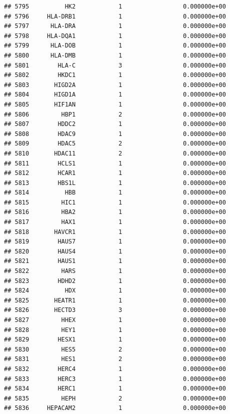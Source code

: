 \documentclass[
]{article}
\begin{document}
\begin{verbatim}
## 5795          HK2            1                 0.000000e+00
## 5796     HLA-DRB1            1                 0.000000e+00
## 5797      HLA-DRA            1                 0.000000e+00
## 5798     HLA-DQA1            1                 0.000000e+00
## 5799      HLA-DOB            1                 0.000000e+00
## 5800      HLA-DMB            1                 0.000000e+00
## 5801        HLA-C            3                 0.000000e+00
## 5802        HKDC1            1                 0.000000e+00
## 5803       HIGD2A            1                 0.000000e+00
## 5804       HIGD1A            1                 0.000000e+00
## 5805       HIF1AN            1                 0.000000e+00
## 5806         HBP1            2                 0.000000e+00
## 5807        HDDC2            1                 0.000000e+00
## 5808        HDAC9            1                 0.000000e+00
## 5809        HDAC5            2                 0.000000e+00
## 5810       HDAC11            2                 0.000000e+00
## 5811        HCLS1            1                 0.000000e+00
## 5812        HCAR1            1                 0.000000e+00
## 5813        HBS1L            1                 0.000000e+00
## 5814          HBB            1                 0.000000e+00
## 5815         HIC1            1                 0.000000e+00
## 5816         HBA2            1                 0.000000e+00
## 5817         HAX1            1                 0.000000e+00
## 5818       HAVCR1            1                 0.000000e+00
## 5819        HAUS7            1                 0.000000e+00
## 5820        HAUS4            1                 0.000000e+00
## 5821        HAUS1            1                 0.000000e+00
## 5822         HARS            1                 0.000000e+00
## 5823        HDHD2            1                 0.000000e+00
## 5824          HDX            1                 0.000000e+00
## 5825       HEATR1            1                 0.000000e+00
## 5826       HECTD3            3                 0.000000e+00
## 5827         HHEX            1                 0.000000e+00
## 5828         HEY1            1                 0.000000e+00
## 5829        HESX1            1                 0.000000e+00
## 5830         HES5            2                 0.000000e+00
## 5831         HES1            2                 0.000000e+00
## 5832        HERC4            1                 0.000000e+00
## 5833        HERC3            1                 0.000000e+00
## 5834        HERC1            1                 0.000000e+00
## 5835         HEPH            2                 0.000000e+00
## 5836     HEPACAM2            1                 0.000000e+00

\end{verbatim}
\end{document}
